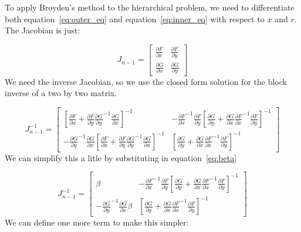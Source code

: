 \documentclass{article}
\begin{document}
To apply Broyden's method to the hierarchical problem, we need to differentiate both equation~\eqref{eq:outer_eq} and equation~\eqref{eq:inner_eq} with respect
to $x$ and $r$. The Jacobian is just:

\begin{equation}
  J_{n-1} =
  \begin{bmatrix}
     \frac{\partial F}{\partial x}  &  \frac{\partial F}{\partial y} \\
     \frac{\partial G}{\partial x}  &  \frac{\partial G}{\partial y}
  \end{bmatrix}
\end{equation}
We need the inverse Jacobian, so we use the closed form solution for the block inverse of a two by two matrix.

\begin{equation}
  J_{n-1}^{-1} =
  \begin{bmatrix}
    \left[ \frac{\partial F}{\partial x} + \frac{\partial F}{\partial y} {\frac{\partial G}{\partial y}}^{-1} \frac{\partial G}{\partial x} \right]^{-1} &
    - {\frac{\partial F}{\partial x}}^{-1} \frac{\partial F}{\partial y} \left[ \frac{\partial G}{\partial y} + \frac{\partial G}{\partial x} {\frac{\partial F}{\partial x}}^{-1} \frac{\partial F}{\partial y} \right]^{-1} \\
    - {\frac{\partial G}{\partial y}}^{-1} \frac{\partial G}{\partial x} \left[ \frac{\partial F}{\partial x} + \frac{\partial F}{\partial y} {\frac{\partial G}{\partial y}}^{-1} \frac{\partial G}{\partial x} \right]^{-1} &
    \left[ \frac{\partial G}{\partial y} + \frac{\partial G}{\partial x} {\frac{\partial F}{\partial x}}^{-1} \frac{\partial F}{\partial y} \right]^{-1}
  \end{bmatrix}
\end{equation}
We can simplify this a litle by substituting in equation~\eqref{eq:beta}

\begin{equation}
  J_{n-1}^{-1} =
  \begin{bmatrix}
    \beta &
    - {\frac{\partial F}{\partial x}}^{-1} \frac{\partial F}{\partial y} \left[ \frac{\partial G}{\partial y} + \frac{\partial G}{\partial x} {\frac{\partial F}{\partial x}}^{-1} \frac{\partial F}{\partial y} \right]^{-1} \\
    - {\frac{\partial G}{\partial y}}^{-1} \frac{\partial G}{\partial x} \beta &
    \left[ \frac{\partial G}{\partial y} + \frac{\partial G}{\partial x} {\frac{\partial F}{\partial x}}^{-1} \frac{\partial F}{\partial y} \right]^{-1}
  \end{bmatrix}
\end{equation}
We can define one more term to make this simpler:
\end{document}
